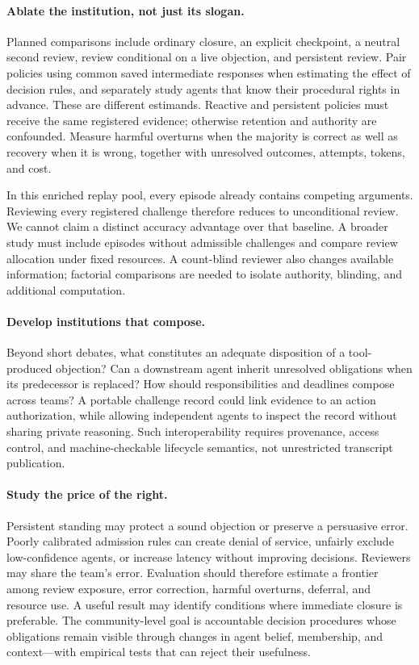 \documentclass[sigconf,anonymous]{aamas}
\begin{document}
\paragraph{Ablate the institution, not just its slogan.}
Planned comparisons include ordinary closure, an explicit checkpoint, a neutral second review, review conditional on a live objection, and persistent review. Pair policies using common saved intermediate responses when estimating the effect of decision rules, and separately study agents that know their procedural rights in advance. These are different estimands. Reactive and persistent policies must receive the same registered evidence; otherwise retention and authority are confounded. Measure harmful overturns when the majority is correct as well as recovery when it is wrong, together with unresolved outcomes, attempts, tokens, and cost.

In this enriched replay pool, every episode already contains competing arguments. Reviewing every registered challenge therefore reduces to unconditional review. We cannot claim a distinct accuracy advantage over that baseline. A broader study must include episodes without admissible challenges and compare review allocation under fixed resources. A count-blind reviewer also changes available information; factorial comparisons are needed to isolate authority, blinding, and additional computation.

\paragraph{Develop institutions that compose.}
Beyond short debates, what constitutes an adequate disposition of a tool-produced objection? Can a downstream agent inherit unresolved obligations when its predecessor is replaced? How should responsibilities and deadlines compose across teams? A portable challenge record could link evidence to an action authorization, while allowing independent agents to inspect the record without sharing private reasoning. Such interoperability requires provenance, access control, and machine-checkable lifecycle semantics, not unrestricted transcript publication.

\paragraph{Study the price of the right.}
Persistent standing may protect a sound objection or preserve a persuasive error. Poorly calibrated admission rules can create denial of service, unfairly exclude low-confidence agents, or increase latency without improving decisions. Reviewers may share the team's error. Evaluation should therefore estimate a frontier among review exposure, error correction, harmful overturns, deferral, and resource use. A useful result may identify conditions where immediate closure is preferable. The community-level goal is accountable decision procedures whose obligations remain visible through changes in agent belief, membership, and context---with empirical tests that can reject their usefulness.
\end{document}
